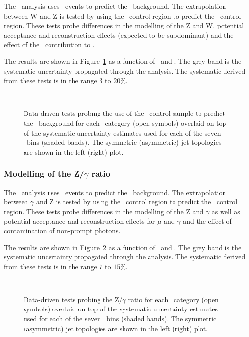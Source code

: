 The \alphat~analysis uses \mj~events to predict the \znunu~background. The extrapolation 
between W and Z is tested by using the \mj~control region to predict the \mmj~control region.
These tests probe differences in the modelling of the Z and W, potential acceptance and
reconstruction effects (expected to be subdominant) and the effect of 
the \ttbar~contribution to \mj.

The results are shown in Figure~\ref{fig:closureMuToMuMu} as a function of \scalht~and \njet. 
The grey band is the systematic uncertainty propagated through the analysis. 
The systematic derived from these tests is
in the range $3$ to $20\%$.

\begin{figure}[h!]
  \begin{center}
    ~~
    \caption{Data-driven tests probing the use of the \mj~control sample
      to predict the \znunu~background for each
      \njet~category (open symbols) overlaid on top of the systematic
      uncertainty estimates used for each of the seven \scalht~bins (shaded bands).  
      The symmetric (asymmetric) jet topologies are shown in the left (right) plot. 
    }
    \label{fig:closureMuToMuMu}
  \end{center} 
\end{figure}
\subsubsection{Modelling of the Z/$\gamma$ ratio}

The \alphat~analysis uses \gj~events to predict the \znunu~background. The extrapolation 
between $\gamma$ and Z is tested by using the \gj~control region to predict the \mmj~control region.
These tests probe differences in the modelling of the Z and $\gamma$ as well as potential acceptance and
reconstruction effects for $\mu$ and $\gamma$ and the effect of contamination of non-prompt photons.

The results are shown in Figure~\ref{fig:closurePhoToMuMu} as a function of \scalht~and \njet. 
The grey band is the systematic uncertainty propagated through the analysis. 
The systematic derived from these tests is in the range $7$ to $15\%$.


\begin{figure}[h!]
  \begin{center}
    ~~
    \caption{Data-driven tests probing the Z/$\gamma$ ratio for each
      \njet~category (open symbols) overlaid on top of the systematic
      uncertainty estimates used for each of the seven \scalht~bins
      (shaded bands). 
      The symmetric (asymmetric) jet topologies are shown in the left (right) plot.      
    }
    \label{fig:closurePhoToMuMu}
  \end{center} 
\end{figure}

